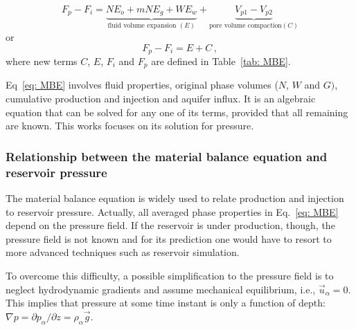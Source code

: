 \documentclass[authoryear,preprint,review,11pt]{elsarticle}
\begin{document}
\begin{equation}\label{eq: MBE}
F_p - F_i= \underbrace{N E_o + mN E_g + W E_w}_{\text{fluid volume expansion } (E)} +\underbrace{V_{p1}-V_{p2}}_{\text{pore volume compaction} (C)}
\end{equation}
or
\begin{equation}\label{eq: MBE_short}
F_p - F_i= E + C \, ,
\end{equation}
where new terms $C$, $E$, $F_i$ and $F_p$ are defined in Table~\ref{tab: MBE}. 

Eq~\eqref{eq: MBE} involves fluid properties, original phase volumes ($N$, $W$ and $G)$, cumulative production and injection and aquifer influx.
It is an algebraic equation that can be solved for any one of its terms, provided that all remaining are known. This works focuses on its solution for pressure.

\subsubsection{Relationship between the material balance equation and reservoir pressure}


The material balance equation is widely used to relate production and injection to reservoir pressure. Actually, all averaged phase properties in Eq.~\eqref{eq: MBE} depend on the pressure field. If the reservoir is under production, though, the pressure field is not known and for its prediction one would have to resort to more advanced techniques such as reservoir simulation.


To overcome this difficulty, a possible simplification to the pressure field is to neglect hydrodynamic gradients and assume mechanical equilibrium, i.e., $\vec{u}_\alpha = 0$. This implies that pressure at some time instant is only a function of depth: $\nabla p = \partial p_\alpha/\partial z = \rho_\alpha \vec{g}$.

\end{document}

